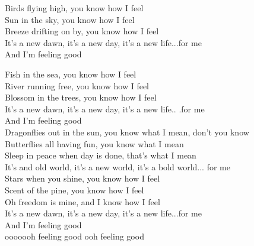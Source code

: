
Birds flying high, you know how I feel \\
Sun in the sky, you know how I feel \\
Breeze drifting on by, you know how I feel \\
It's a new dawn, it's a new day, it's a new life...for me \\
And I'm feeling good \\



Fish in the sea, you know how I feel \\
River running free, you know how I feel \\
Blossom in the trees, you know how I feel \\
It's a new dawn, it's a new day, it's a new life..  .for me \\
And I'm feeling good \\
Dragonflies out in the sun, you know what I mean, don't you know \\
Butterflies all having fun, you know what I mean \\
Sleep in peace when day is done, that's what I mean \\
It's and old world, it's a new world, it's a bold world...  for me \\
Stars when you shine, you know how I feel \\
Scent of the pine, you know how I feel \\
Oh freedom is mine, and I know how I feel \\
It's a new dawn, it's a new day, it's a new life...for me \\
And I'm feeling good \\
ooooooh feeling good ooh feeling good

